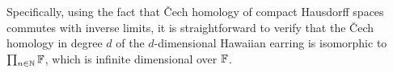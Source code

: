 Specifically, using the fact that \v{C}ech homology of compact Hausdorff spaces commutes with inverse limits, it is straightforward to verify that the \v{C}ech homology in degree $d$ of the $d$-dimensional Hawaiian earring is isomorphic to $\prod_{n\in\mathbb{N}}\mathbb{F}$, which is infinite dimensional over $\mathbb{F}$.
%
%
